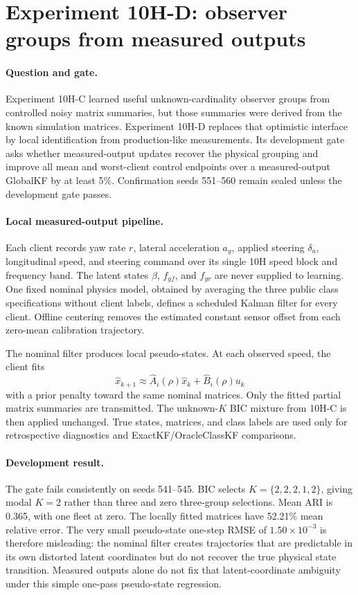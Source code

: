\section{Experiment 10H-D: observer groups from measured outputs}
\label{sec:experiment10hd}

\paragraph{Question and gate.}
Experiment 10H-C learned useful unknown-cardinality observer groups from
controlled noisy matrix summaries, but those summaries were derived from the
known simulation matrices. Experiment 10H-D replaces that optimistic interface
by local identification from production-like measurements. Its development
gate asks whether measured-output updates recover the physical grouping and
improve all mean and worst-client control endpoints over a measured-output
GlobalKF by at least 5\%. Confirmation seeds 551--560 remain sealed unless the
development gate passes.

\paragraph{Local measured-output pipeline.}
Each client records yaw rate $r$, lateral acceleration $a_y$, applied steering
$\delta_a$, longitudinal speed, and steering command over its single 10H speed
block and frequency band. The latent states $\beta$, $f_{yf}$, and $f_{yr}$ are
never supplied to learning. One fixed nominal physics model, obtained by
averaging the three public class specifications without client labels, defines
a scheduled Kalman filter for every client. Offline centering removes the
estimated constant sensor offset from each zero-mean calibration trajectory.

The nominal filter produces local pseudo-states. At each observed speed, the
client fits
\begin{equation}
 \hat x_{k+1}\approx \hat A_i(\rho)\hat x_k+\hat B_i(\rho)u_k
\end{equation}
with a prior penalty toward the same nominal matrices. Only the fitted partial
matrix summaries are transmitted. The unknown-$K$ BIC mixture from 10H-C is
then applied unchanged. True states, matrices, and class labels are used only
for retrospective diagnostics and ExactKF/OracleClassKF comparisons.

\paragraph{Development result.}
The gate fails consistently on seeds 541--545. BIC selects
$K=\{2,2,2,1,2\}$, giving modal $K=2$ rather than three and zero three-group
selections. Mean ARI is 0.365, with one fleet at zero. The locally fitted
matrices have 52.21\% mean relative error. The very small pseudo-state
one-step RMSE of $1.50\times10^{-3}$ is therefore misleading: the nominal
filter creates trajectories that are predictable in its own distorted latent
coordinates but do not recover the true physical state transition. Measured
outputs alone do not fix that latent-coordinate ambiguity under this simple
one-pass pseudo-state regression.

